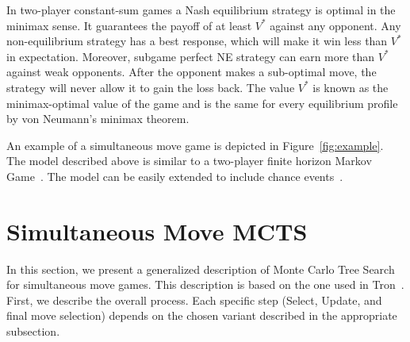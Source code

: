 \documentclass[conference]{IEEEtran}
\newcommand{\cT}{\mathcal{T}}
\newcommand{\ie}{{\it i.e.,}~}
\begin{document}
In two-player constant-sum games a Nash equilibrium strategy is optimal in the minimax sense. It guarantees the payoff of at least $V^*$ against any opponent. Any 
non-equilibrium strategy has a best response, which will make it win less than $V^*$ in expectation. Moreover, subgame perfect NE strategy can earn more 
than $V^*$ against weak opponents. After the opponent makes a sub-optimal move, the strategy will never allow it to gain the loss back. 
The value $V^*$ is known as the minimax-optimal value of the game and is the same for every equilibrium profile by von Neumann's minimax theorem.


An example of a simultaneous move game is depicted in Figure~\ref{fig:example}. 
The model described above is similar to a two-player finite horizon Markov Game~\cite{Littman94markovgames}.
The model can be easily extended to include chance events~\cite{Lanctot13Goofspiel}. 

\section{Simultaneous Move MCTS}
\label{sec:smmcts}

\newcommand{\SMMCTS}{{\sc SM-MCTS}}
\newcommand{\ExpReq}{{\sc ExpansionRequired}}
\newcommand{\Update}{{\sc Update}}
\newcommand{\Select}{{\sc Select}}
\newcommand{\Playout}{{\sc Playout}}
\newcommand{\Max}{\text{Max}}
\newcommand{\Min}{\text{Min}}


In this section, we present a generalized description of Monte Carlo Tree Search for simultaneous move games. This 
description is based on the one used in Tron~\cite{Perick12Comparison}. First, we describe the overall process. 
Each specific step (\Select, \Update, and final move selection) depends on the chosen variant described in the 
appropriate subsection. 
\end{document}
